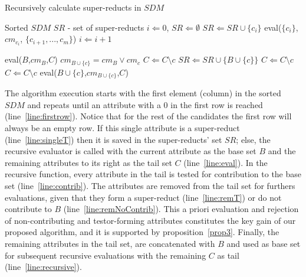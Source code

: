 \documentclass[authoryear,11pt]{elsarticle}
\begin{document}
	\renewcommand{\algorithmicrequire}{\textbf{Input:}}
	\renewcommand{\algorithmicensure}{\textbf{Output:}}
	\begin{algorithm}
	\caption{Recursively calculate super-reducts in $SDM$}
	\label{alg1}
	\begin{multicols}{2}
	\begin{algorithmic}[1]
	  \Require Sorted $SDM$
      \Ensure $SR$ - set of super-reducts
	  \State $i \Leftarrow 0$, $SR \Leftarrow \emptyset$
	  \label{line:firstrow}
	  	\label{line:singleT}
	  		\State $SR \Leftarrow SR\cup \lbrace c_i \rbrace$
	  	\Else
	  		\State eval($\lbrace c_i \rbrace$, $cm_{c_i}$, $\lbrace c_{i+1},..., c_m\rbrace$)\label{line:eval}
	  	\EndIf
	  	\State $i \Leftarrow i+1$
	  \EndWhile
	  \item[] \item[] \item[]
	  \State eval($B$,$cm_B$,$C$)
	  	\State $cm_{B\cup \lbrace c\rbrace}=cm_B \vee cm_c$
	  	\label{line:contrib}
	  			\State $C \Leftarrow C\setminus c$\label{line:remT} 
	  			\State $SR \Leftarrow SR\cup\lbrace B\cup \lbrace c\rbrace \rbrace$
	  		\EndIf
	  	\Else
	  		\State $C \Leftarrow C\setminus c$\label{line:remNoContrib} 
	  	\EndIf
	  \EndFor
	  	\State $C \Leftarrow C\setminus c$
	  	\State eval($B\cup \lbrace c\rbrace$,$cm_{B\cup \lbrace c\rbrace}$,$C$)\label{line:recursive} 
	  \EndFor
	\end{algorithmic}
	\end{multicols}
	\end{algorithm}
	
	
	The algorithm execution starts with the first element (column) in the sorted $SDM$ and repeats until an 
	attribute with a 0 in the first row is reached (line~\ref{line:firstrow}). Notice that for the rest of the
	candidates the first row will always be an empty row. If this single attribute is a super-reduct
	(line~\ref{line:singleT}) then it is saved in the super-reducts' set $SR$; else, the recursive evaluator 
	is called with the current attribute as the base set $B$ and the remaining attributes to its right as the 
	tail set $C$ (line~\ref{line:eval}).
	In the recursive function, every attribute in the tail is tested for contribution to the base set 
	(line~\ref{line:contrib}). The attributes are removed from the tail set for furthers evaluations, given
	that they form a super-reduct (line~\ref{line:remT}) or do not contribute to $B$
	(line~\ref{line:remNoContrib}).
	This a priori evaluation and rejection of non-contributing and testor-forming attributes constitutes the key
	gain of our proposed algorithm, and it is supported by proposition~\ref{prop3}.
	Finally, the remaining attributes in the tail set, are concatenated with $B$ and used as base set for
	subsequent recursive evaluations with the remaining $C$ as tail (line~\ref{line:recursive}).
	
\end{document}
